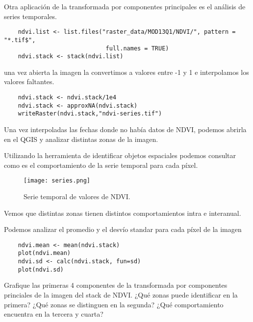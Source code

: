\begin{exa}
    Otra aplicaci\'on de la transformada por componentes principales
    es el an\'alisis de series temporales.
    \begin{lstlisting}
    ndvi.list <- list.files("raster_data/MOD13Q1/NDVI/", pattern = "*.tif$",
                             full.names = TRUE)
    ndvi.stack <- stack(ndvi.list)
    \end{lstlisting}
    una vez abierta la imagen la convertimos a valores entre -1 y 1 e
    interpolamos los valores faltantes.
    \begin{lstlisting}
    ndvi.stack <- ndvi.stack/1e4
    ndvi.stack <- approxNA(ndvi.stack)
    writeRaster(ndvi.stack,"ndvi-series.tif")
    \end{lstlisting}
    Una vez interpoladas las fechas donde no hab\'ia datos de NDVI, podemos
    abrirla en el QGIS y analizar distintas zonas de la imagen.

    Utilizando la herramienta de identificar objetos espaciales podemos
    consultar como es el comportamiento de la serie temporal para cada p\'ixel.

    \begin{figure}[h!]
    \begin{center}
        \texttt{[image: series.png]}
    \end{center}
    \caption{Serie temporal de valores de NDVI.}
    \label{fig:series}
    \end{figure}

    Vemos que distintas zonas tienen distintos comportamientos intra e
    interanual.

    Podemos analizar el promedio y el desv\'io standar para cada p\'ixel de la
    imagen
    \begin{lstlisting}
    ndvi.mean <- mean(ndvi.stack)
    plot(ndvi.mean)
    ndvi.sd <- calc(ndvi.stack, fun=sd)
    plot(ndvi.sd)
    \end{lstlisting}
\end{exa}

\begin{act}
    Grafique las primeras 4 componentes de la transformada por componentes
    princiales de la imagen del stack de NDVI\@. ¿Qu\'e zonas puede identificar en la
    primera? ¿Qu\'e zonas se distinguen en la segunda? ¿Qu\'e comportamiento encuentra
    en la tercera y cuarta?
\end{act}
